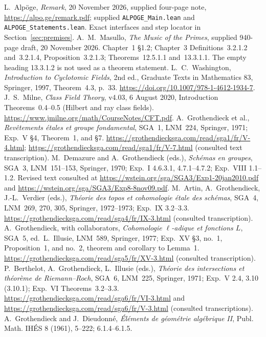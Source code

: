  L.~Alp\"oge, \emph{Remark}, 20 November 2026, supplied four-page note,
\url{https://alpo.ge/remark.pdf}; supplied \texttt{ALPOGE\_Main.lean} and
\texttt{ALPOGE\_Statements.lean}. Exact interfaces and step locator in Section~\ref{sec:premises}.
 A.~M.~Masullo, \emph{The Music of the Primes}, supplied 940-page draft,
20 November 2026. Chapter~1 \S1.2; Chapter~3 Definitions~3.2.1.2 and~3.2.1.4,
Proposition~3.2.1.3; Theorems~12.5.1.1 and~13.3.1.1. The empty heading
13.3.1.2 is not used as a theorem statement.
 L.~C.~Washington, \emph{Introduction to Cyclotomic Fields},
2nd ed., Graduate Texts in Mathematics 83, Springer, 1997, Theorem~4.3, p.~33.
\url{https://doi.org/10.1007/978-1-4612-1934-7}.
 J.~S.~Milne, \emph{Class Field Theory}, v4.03, 6 August 2020,
Introduction Theorems~0.4--0.5 (Hilbert and ray class fields).
\url{https://www.jmilne.org/math/CourseNotes/CFT.pdf}.
 A.~Grothendieck et al., \emph{Rev\^etements \'etales et groupe fondamental},
SGA~1, LNM~224, Springer, 1971; Exp.~V \S4, Theorem~1, and \S7.
\url{https://grothendiecksga.com/read/sga1/fr/V-4.html};
\url{https://grothendiecksga.com/read/sga1/fr/V-7.html} (consulted text transcription).
 M.~Demazure and A.~Grothendieck (eds.), \emph{Sch\'emas en groupes},
SGA~3, LNM~151--153, Springer, 1970; Exp.~I 4.6.3.1, 4.7.1--4.7.2;
Exp.~VIII 1.1--1.2. Revised text consulted at
\url{https://wstein.org/sga/SGA3/Exp1-20jan2010.pdf} and
\url{https://wstein.org/sga/SGA3/Exp8-8nov09.pdf}.
 M.~Artin, A.~Grothendieck, J.-L.~Verdier (eds.),
\emph{Th\'eorie des topos et cohomologie \'etale des sch\'emas}, SGA~4,
LNM~269, 270, 305, Springer, 1972--1973; Exp.~IX 3.2--3.3.
\url{https://grothendiecksga.com/read/sga4/fr/IX-3.html} (consulted transcription).
 A.~Grothendieck, with collaborators, \emph{Cohomologie $\ell$-adique
et fonctions $L$}, SGA~5, ed.~L.~Illusie, LNM~589, Springer, 1977;
Exp.~XV \S3, no.~1, Proposition~1, and no.~2, theorem and corollary to Lemma~1.
\url{https://grothendiecksga.com/read/sga5/fr/XV-3.html} (consulted transcription).
 P.~Berthelot, A.~Grothendieck, L.~Illusie (eds.),
\emph{Th\'eorie des intersections et th\'eor\`eme de Riemann--Roch}, SGA~6,
LNM~225, Springer, 1971; Exp.~V 2.4, 3.10 (3.10.1);
Exp.~VI Theorems~3.2--3.3.
\url{https://grothendiecksga.com/read/sga6/fr/VI-3.html} and
\url{https://grothendiecksga.com/read/sga6/fr/V-3.html} (consulted transcriptions).
 A.~Grothendieck and J.~Dieudonn\'e, \emph{\'El\'ements de g\'eom\'etrie
alg\'ebrique II}, Publ. Math. IH\'ES 8 (1961), 5--222; 6.1.4--6.1.5.
